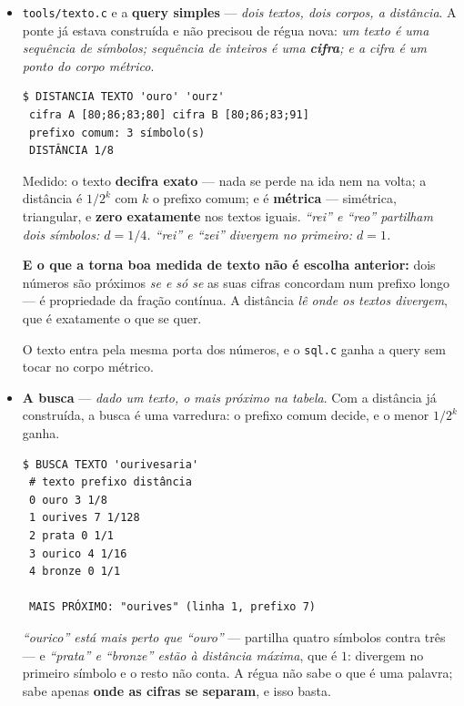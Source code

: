 \documentclass[11pt]{article}
\newcommand{\code}[1]{\texttt{\small #1}}
\theoremstyle{plain}
\theoremstyle{remark}
\begin{document}
\begin{itemize}
Dentro do constante o $m$ indexa a família real, e $m=1$ é $[1;1,1,\dots]$: \textbf{o rei} --- o
mais fechado, o mais mal aproximável que existe. A distância lá é $|m_1-m_2|$, em número; entre
regimes não é número --- é \textbf{travessia}, que é o deformar.
\item \code{tools/texto.c} e a \textbf{query simples} --- \emph{dois textos, dois corpos, a
distância}. A ponte já estava construída e não precisou de régua nova: \emph{um texto é uma
sequência de símbolos; sequência de inteiros é uma \textbf{cifra}; e a cifra é um ponto do corpo
métrico}.

\begin{verbatim}
$ DISTANCIA TEXTO 'ouro' 'ourz'
 cifra A [80;86;83;80] cifra B [80;86;83;91]
 prefixo comum: 3 símbolo(s)
 DISTÂNCIA 1/8
\end{verbatim}

Medido: o texto \textbf{decifra exato} --- nada se perde na ida nem na volta; a distância é
$1/2^k$ com $k$ o prefixo comum; e é \textbf{métrica} --- simétrica, triangular, e \textbf{zero
exatamente} nos textos iguais. \emph{``rei'' e ``reo'' partilham dois símbolos: $d = 1/4$. ``rei'' e
``zei'' divergem no primeiro: $d = 1$.}

\textbf{E o que a torna boa medida de texto não é escolha anterior:} dois números são próximos
\emph{se e só se} as suas cifras concordam num prefixo longo --- é propriedade da fração contínua.
A distância \emph{lê onde os textos divergem}, que é exatamente o que se quer.

O texto entra pela mesma porta dos números, e o \code{sql.c} ganha a query sem tocar no corpo
métrico.

\item \textbf{A busca} --- \emph{dado um texto, o mais próximo na tabela}. Com a distância já
construída, a busca é uma varredura: o prefixo comum decide, e o menor $1/2^k$ ganha.

\begin{verbatim}
$ BUSCA TEXTO 'ourivesaria'
 # texto prefixo distância
 0 ouro 3 1/8
 1 ourives 7 1/128
 2 prata 0 1/1
 3 ourico 4 1/16
 4 bronze 0 1/1

 MAIS PRÓXIMO: "ourives" (linha 1, prefixo 7)
\end{verbatim}

\emph{``ourico'' está mais perto que ``ouro''} --- partilha quatro símbolos contra três --- e
\emph{``prata'' e ``bronze'' estão à distância máxima}, que é $1$: divergem no primeiro símbolo e
o resto não conta. A régua não sabe o que é uma palavra; sabe apenas \textbf{onde as cifras se
separam}, e isso basta.


\end{itemize}
\end{document}
